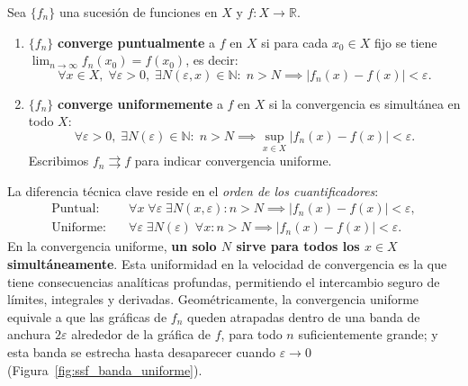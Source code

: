 \begin{definition}
Sea $\{f_n\}$ una sucesión de funciones en $X$ y $f : X \to \mathbb{R}$.
\begin{enumerate}
    \item $\{f_n\}$ \textbf{converge puntualmente} a $f$ en $X$ si
          para cada $x_0 \in X$ fijo se tiene
          $\lim_{n \to \infty} f_n(x_0) = f(x_0)$, es decir:
          \[
              \forall x \in X,\;\forall\varepsilon > 0,\;
              \exists N(\varepsilon,x) \in \mathbb{N}:\;
              n > N \implies |f_n(x) - f(x)| < \varepsilon.
          \]
    \item $\{f_n\}$ \textbf{converge uniformemente} a $f$ en $X$ si
          la convergencia es simultánea en todo $X$:
          \[
              \forall\varepsilon > 0,\;
              \exists N(\varepsilon) \in \mathbb{N}:\;
              n > N \implies \sup_{x\in X}|f_n(x) - f(x)| < \varepsilon.
          \]
          Escribimos $f_n \rightrightarrows f$ para indicar
          convergencia uniforme.
\end{enumerate}
\end{definition}

\begin{rem}
La diferencia técnica clave reside en el \emph{orden de los
cuantificadores}:
\begin{align*}
    \text{Puntual:}  &\quad
        \forall x\;\forall\varepsilon\;\exists N(x,\varepsilon)\colon
        n>N \implies |f_n(x)-f(x)|<\varepsilon,\\
    \text{Uniforme:} &\quad
        \forall\varepsilon\;\exists N(\varepsilon)\;\forall x\colon
        n>N \implies |f_n(x)-f(x)|<\varepsilon.
\end{align*}
En la convergencia uniforme, \textbf{un solo $N$ sirve para todos los
$x \in X$ simultáneamente}. Esta uniformidad en la velocidad de
convergencia es la que tiene consecuencias analíticas profundas,
permitiendo el intercambio seguro de límites, integrales y derivadas.
Geométricamente, la convergencia uniforme equivale a que las gráficas
de $f_n$ queden atrapadas dentro de una banda de anchura $2\varepsilon$
alrededor de la gráfica de $f$, para todo $n$ suficientemente grande;
y esta banda se estrecha hasta desaparecer cuando $\varepsilon\to 0$
(Figura~\ref{fig:ssf_banda_uniforme}).
\end{rem}


